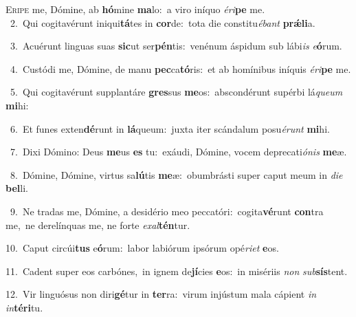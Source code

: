 \lettrine{\initial\textcolor{\initialcolor}{E}}{ripe} me, Dómine, ab \textbf{hó}\-mine \textbf{ma}\-lo:~\star a viro iníquo \textit{é}\-\textit{ri}\textbf{pe} me.\\
{\numbfont\textcolor{\numbcolor}{~2.}}~Qui cogitavérunt iniqui\-\textbf{tá}\-tes in \textbf{cor}\-de:~\star tota die constitu\-\textit{é}\-\textit{bant} \textbf{prǽ}\-\textbf{li}a.\par
{\numbfont\textcolor{\numbcolor}{~3.}}~Acuérunt linguas suas \textbf{sic}\-ut ser\-\textbf{pén}\-tis:~\star venénum áspidum sub lábi\textit{is} \textit{e}\-\textbf{ó}rum.\par
{\numbfont\textcolor{\numbcolor}{~4.}}~Custódi me, Dómine, de manu \textbf{pec}\-ca\-\textbf{tó}\-ris:~\star et ab homínibus iníquis \textit{é}\-\textit{ri}\textbf{pe} me.\par
{\numbfont\textcolor{\numbcolor}{~5.}}~Qui cogitavérunt supplantáre \textbf{gres}\-sus \textbf{me}\-os:~\star abscondérunt supérbi lá\-\textit{que}\-\textit{um} \textbf{mi}\-hi:\par
{\numbfont\textcolor{\numbcolor}{~6.}}~Et funes exten\-\textbf{dé}\-runt in \textbf{lá}\-queum:~\star juxta iter scándalum posu\-\textit{é}\-\textit{runt} \textbf{mi}\-hi.\par
{\numbfont\textcolor{\numbcolor}{~7.}}~Dixi Dómino: Deus \textbf{me}\-us \textbf{es} tu:~\star exáudi, Dómine, vocem deprecati\-\textit{ó}\-\textit{nis} \textbf{me}\-æ.\par
{\numbfont\textcolor{\numbcolor}{~8.}}~Dómine, Dómine, virtus sa\-\textbf{lú}\-tis \textbf{me}\-æ:~\star obumbrásti super caput meum in \textit{di}\-\textit{e} \textbf{bel}\-li.\par
{\numbfont\textcolor{\numbcolor}{~9.}}~Ne tradas me, Dómine, a desidério meo peccatóri:~\dagger cogita\-\textbf{vé}\-runt \textbf{con}\-tra me,~\star ne derelínquas me, ne forte \textit{ex}\-\textit{al}\textbf{tén}tur.\par
{\numbfont\textcolor{\numbcolor}{10.}}~Caput circúi\textbf{tus} e\-\textbf{ó}\-rum:~\star labor labiórum ipsórum opé\-\textit{ri}\-\textit{et} \textbf{e}\-os.\par
{\numbfont\textcolor{\numbcolor}{11.}}~Cadent super eos carbónes,~\dagger in ignem de\-\textbf{jí}\-cies \textbf{e}\-os:~\star in misériis \textit{non} \textit{sub}\-\textbf{sís}tent.\par
{\numbfont\textcolor{\numbcolor}{12.}}~Vir linguósus non diri\-\textbf{gé}\-tur in \textbf{ter}\-ra:~\star virum injústum mala cápient \textit{in} \textit{in}\-\textbf{tér}\textbf{i}tu.\par
